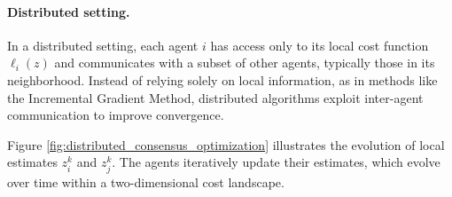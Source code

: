 \paragraph{Distributed setting.}
In a distributed setting, each agent $i$ has access only to its local cost function $\ell_i(z)$ and communicates with a subset of other agents, typically those in its neighborhood. Instead of relying solely on local information, as in methods like the Incremental Gradient Method, distributed algorithms exploit inter-agent communication to improve convergence.

Figure \ref{fig:distributed_consensus_optimization} illustrates the evolution of local estimates $z_i^k$ and $z_j^k$. The agents iteratively update their estimates, which evolve over time within a two-dimensional cost landscape.

